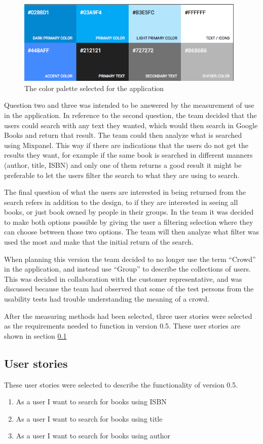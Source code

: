 \begin{figure}
\centering
\includegraphics[height=4cm]{figs/v05/color-palette.png}
\caption{The color palette selected for the application}
\label{fig:color-palette}
\end{figure}

Question two and three was intended to be answered by the measurement of use in the application. In reference to the second question, the team decided that the users could search with any text they wanted, which would then search in Google Books and return that result. The team could then analyze what is searched using Mixpanel. This way if there are indications that the users do not get the results they want, for example if the same book is searched in different manners (author, title, ISBN) and only one of them returns a good result it might be preferable to let the users filter the search to what they are using to search.

The final question of what the users are interested in being returned from the search refers in addition to the design, to if they are interested in seeing all books, or just book owned by people in their groups. In the team it was decided to make both options possible by giving the user a filtering selection where they can choose between those two options. The team will then analyze what filter was used the most and make that the initial return of the search.

When planning this version the team decided to no longer use the term “Crowd” in the application, and instead use “Group” to describe the collections of users. This was decided in collaboration with the customer representative, and was discussed because the team had observed that some of the test persons from the usability tests had trouble understanding the meaning of a crowd.

After the measuring methods had been selected, three user stories were selected as the requirements needed to function in version 0.5. These user stories are shown in section \ref{user-stories-v5}


\subsection{User stories}
\label{user-stories-v5}
These user stories were selected to describe the functionality of version 0.5.
\begin{enumerate}
  \item As a user I want to search for books using ISBN
  \item As a user I want to search for books using title
  \item As a user I want to search for books using author
\end{enumerate}


